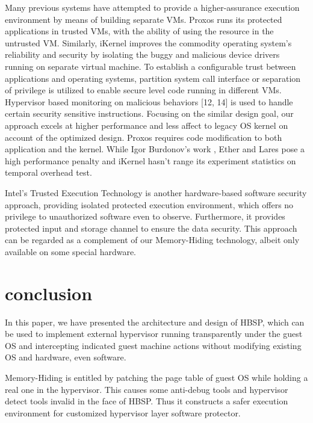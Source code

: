 \documentclass[conference]{IEEEtran}
\begin{document}
{Many previous systems have attempted to provide a higher-assurance
execution environment by means of building separate VMs.
Proxos\cite{IEEEhowto:12} runs its protected applications in
trusted VMs, with the ability of using the resource in the
untrusted VM. Similarly, iKernel\cite{IEEEhowto:13} improves the
commodity operating system's reliability and security by isolating
the buggy and malicious device drivers running on separate virtual
machine. To establish a configurable trust between applications
and operating systems, partition system call interface  or
separation of privilege\cite{IEEEhowto:15} is utilized to enable
secure level code running in different VMs. Hypervisor based
monitoring on malicious behaviors [12, 14] is used to handle
certain security sensitive instructions. Focusing on the similar
design goal, our approach excels at higher performance and less
affect to legacy OS kernel on account of the optimized design.
Proxos \cite{IEEEhowto:12} requires code modification to both
application and the kernel. While Igor Burdonov's work
\cite{IEEEhowto:15}, Ether \cite{IEEEhowto:16} and Lares
\cite{IEEEhowto:18} pose a high performance penalty and iKernel
\cite{IEEEhowto:13} hasn't range its experiment statistics on
temporal overhead test.

Intel's Trusted Execution Technology\cite{IEEEhowto:17} is another
hardware-based software security approach, providing isolated
protected execution environment, which offers no privilege to
unauthorized software even to observe. Furthermore, it provides
protected input and storage channel to ensure the data security.
This approach can be regarded as a complement of our Memory-Hiding
technology, albeit only available on some special hardware.

\bigskip

\section{conclusion}
In this paper, we have presented the architecture and design of
HBSP, which can be used to implement external hypervisor running
transparently under the guest OS and intercepting indicated guest
machine actions without modifying existing OS and hardware, even
software.

Memory-Hiding is entitled by patching the page table of guest OS
while holding a real one in the hypervisor. This causes some
anti-debug tools and hypervisor detect tools invalid in the face of
HBSP. Thus it constructs a safer execution environment for
customized hypervisor layer software protector.

}
\end{document}
